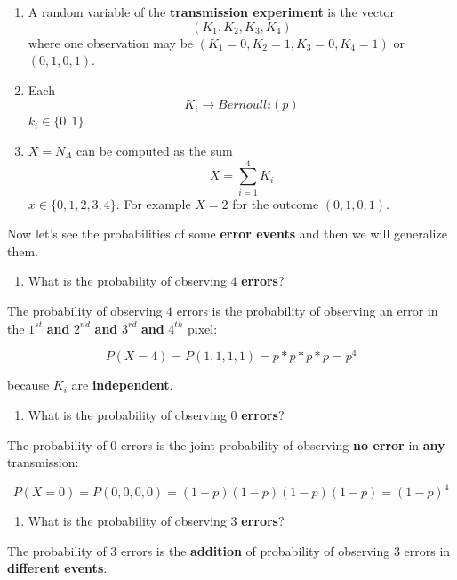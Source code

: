 \documentclass[
]{book}
\providecommand{\tightlist}{%
  \setlength{\itemsep}{0pt}\setlength{\parskip}{0pt}}
\begin{document}
\begin{enumerate}
\def\labelenumi{\arabic{enumi})}
\item
  A random variable of the \textbf{transmission experiment} is the vector \[(K_1, K_2, K_3, K_4)\] where one observation may be \((K_1=0, K_2=1, K_3=0, K_4=1)\) or \((0, 1, 0, 1)\).
\item
  Each \[K_i \rightarrow Bernoulli(p)\] \(k_i \in \{0, 1\}\)
\item
  \(X=N_A\) can be computed as the sum \[X=\sum_{i=1}^4 K_i\] \(x\in \{0,1,2,3,4\}\). For example \(X=2\) for the outcome \((0, 1, 0, 1)\).
\end{enumerate}

Now let's see the probabilities of some \textbf{error events} and then we will generalize them.

\begin{enumerate}
\def\labelenumi{\arabic{enumi})}
\tightlist
\item
  What is the probability of observing \(4\) \textbf{errors}?
\end{enumerate}

The probability of observing \(4\) errors is the probability of observing an error in the \(1^{st}\) \textbf{and} \(2^{nd}\) \textbf{and} \(3^{rd}\) \textbf{and} \(4^{th}\) pixel:

\[P(X=4)=P(1,1,1,1)=p*p*p*p=p^4\]

because \(K_i\) are \textbf{independent}.

\begin{enumerate}
\def\labelenumi{\arabic{enumi})}
\setcounter{enumi}{1}
\tightlist
\item
  What is the probability of observing \(0\) \textbf{errors}?
\end{enumerate}

The probability of \(0\) errors is the joint probability of observing \textbf{no error} in \textbf{any} transmission:

\[P(X=0)=P(0,0,0,0)=(1-p)(1-p)(1-p)(1-p)=(1-p)^4\]

\begin{enumerate}
\def\labelenumi{\arabic{enumi})}
\setcounter{enumi}{2}
\tightlist
\item
  What is the probability of observing \(3\) \textbf{errors}?
\end{enumerate}

The probability of \(3\) errors is the \textbf{addition} of probability of observing \(3\) errors in \textbf{different events}:
\end{document}
